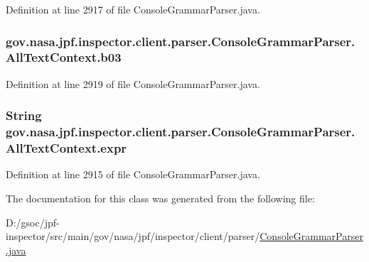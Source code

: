 Definition at line 2917 of file Console\+Grammar\+Parser.\+java.

\subsubsection[{\texorpdfstring{b03}{b03}}]{ gov.\+nasa.\+jpf.\+inspector.\+client.\+parser.\+Console\+Grammar\+Parser.\+All\+Text\+Context.\+b03}\hypertarget{classgov_1_1nasa_1_1jpf_1_1inspector_1_1client_1_1parser_1_1_console_grammar_parser_1_1_all_text_context_a444193836ae82cfc33eb0b0a4dbd3537}{}\label{classgov_1_1nasa_1_1jpf_1_1inspector_1_1client_1_1parser_1_1_console_grammar_parser_1_1_all_text_context_a444193836ae82cfc33eb0b0a4dbd3537}


Definition at line 2919 of file Console\+Grammar\+Parser.\+java.

\subsubsection[{\texorpdfstring{expr}{expr}}]{\setlength{\rightskip}{0pt plus 5cm}String gov.\+nasa.\+jpf.\+inspector.\+client.\+parser.\+Console\+Grammar\+Parser.\+All\+Text\+Context.\+expr}\hypertarget{classgov_1_1nasa_1_1jpf_1_1inspector_1_1client_1_1parser_1_1_console_grammar_parser_1_1_all_text_context_ac0e464b9e367b00886e8c46acde196fd}{}\label{classgov_1_1nasa_1_1jpf_1_1inspector_1_1client_1_1parser_1_1_console_grammar_parser_1_1_all_text_context_ac0e464b9e367b00886e8c46acde196fd}


Definition at line 2915 of file Console\+Grammar\+Parser.\+java.



The documentation for this class was generated from the following file\+:\begin{DoxyCompactItemize}
\item 
D\+:/gsoc/jpf-\/inspector/src/main/gov/nasa/jpf/inspector/client/parser/\hyperlink{_console_grammar_parser_8java}{Console\+Grammar\+Parser.\+java}\end{DoxyCompactItemize}

